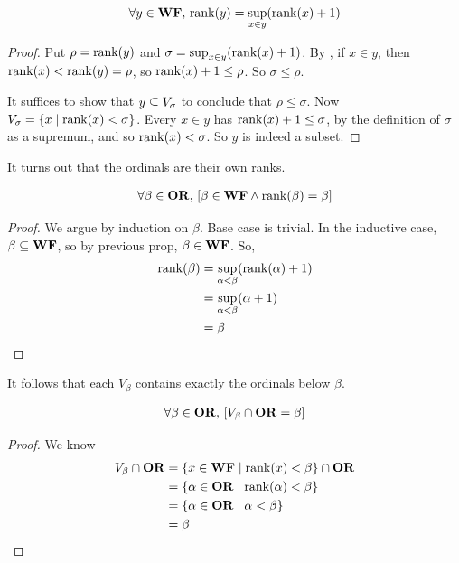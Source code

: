 \begin{boxproposition}
    \begin{align*}
        \forall y \in \mathbf{WF}, \, \operatorname{rank}\!\left( y \right) = \sup_{x \in y}\!\left( \operatorname{rank}\!\left( x \right) + 1 \right)
    \end{align*}
\end{boxproposition}
\begin{proof}
    Put $\rho = \operatorname{rank}\!\left( y \right)$ and $\sigma = \sup_{x \in y}\!\left( \operatorname{rank}\!\left( x \right) + 1 \right)$. By , if $x \in y$, then $\operatorname{rank}\!\left( x \right) < \operatorname{rank}\!\left( y \right) = \rho$, so $\operatorname{rank}\!\left( x \right) + 1 \leq \rho$. So $\sigma \leq \rho$.

    It suffices to show that $y \subseteq V_{\sigma}$ to conclude that $\rho \leq \sigma$. Now $V_{\sigma} = \left\{ x \; \middle\vert \; \operatorname{rank}\!\left( x \right) < \sigma \right\}$. Every $x \in y$ has $\operatorname{rank}\!\left( x \right) + 1 \leq \sigma$, by the definition of $\sigma$ as a supremum, and so $\operatorname{rank}\!\left( x \right) < \sigma$. So $y$ is indeed a subset.
\end{proof}

It turns out that the ordinals are their own ranks.

\begin{boxproposition}
    \begin{align*}
        \forall \beta \in \mathbf{OR}, \,
        \left[ \beta \in \mathbf{WF} \land \operatorname{rank}\!\left( \beta \right) = \beta \right]
    \end{align*}
\end{boxproposition}
\begin{proof}
    We argue by induction on $\beta$. Base case is trivial. In the inductive case, $\beta \subseteq \mathbf{WF}$, so by previous prop, $\beta \in \mathbf{WF}$. So,
    \begin{align*}
        \operatorname{rank}\!\left( \beta \right)
        &= \sup_{\alpha < \beta}\!\left( \operatorname{rank}\!\left( \alpha \right) + 1 \right) \\
        &= \sup_{\alpha < \beta}\!\left( \alpha + 1 \right) \\
        &= \beta
    \end{align*}
\end{proof}

It follows that each $V_{\beta}$ contains exactly the ordinals below $\beta$.

\begin{boxproposition}
    \begin{align*}
        \forall \beta \in \mathbf{OR}, \,
        \left[ V_{\beta} \cap \mathbf{OR} = \beta \right]
    \end{align*}
\end{boxproposition}
\begin{proof}
    We know
    \begin{align*}
        V_{\beta} \cap \mathbf{OR}
        &= \left\{ x \in \mathbf{WF} \; \middle\vert \; \operatorname{rank}\!\left( x \right) < \beta \right\} \cap \mathbf{OR} \\
        &= \left\{ \alpha \in \mathbf{OR} \; \middle\vert \; \operatorname{rank}\!\left( \alpha \right) < \beta \right\} \\
        &= \left\{ \alpha \in \mathbf{OR} \; \middle\vert \; \alpha < \beta \right\} \\
        &= \beta
    \end{align*}
\end{proof}

